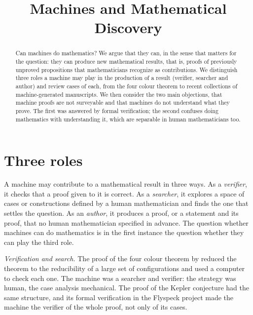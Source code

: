 \documentclass{situationist-preprint}
\title{Machines and Mathematical Discovery}
\begin{document}
\maketitle

\begin{abstract}
Can machines do mathematics? We argue that they can, in the sense that matters for the question: they can produce new mathematical results, that is, proofs of previously unproved propositions that mathematicians recognize as contributions. We distinguish three roles a machine may play in the production of a result (verifier, searcher and author) and review cases of each, from the four colour theorem to recent collections of machine-generated manuscripts. We then consider the two main objections, that machine proofs are not surveyable and that machines do not understand what they prove. The first was answered by formal verification; the second confuses doing mathematics with understanding it, which are separable in human mathematicians too.
\end{abstract}

\section{Three roles}

A machine may contribute to a mathematical result in three ways. As a \emph{verifier}, it checks that a proof given to it is correct. As a \emph{searcher}, it explores a space of cases or constructions defined by a human mathematician and finds the one that settles the question. As an \emph{author}, it produces a proof, or a statement and its proof, that no human mathematician specified in advance. The question whether machines can do mathematics is in the first instance the question whether they can play the third role.

\emph{Verification and search.} The proof of the four colour theorem by \citet{AppelHaken1977} reduced the theorem to the reducibility of a large set of configurations and used a computer to check each one. The machine was a searcher and verifier: the strategy was human, the case analysis mechanical. The proof of the Kepler conjecture \citep{Hales2005} had the same structure, and its formal verification in the Flyspeck project \citep{HalesEtAl2017} made the machine the verifier of the whole proof, not only of its cases.
\end{document}
